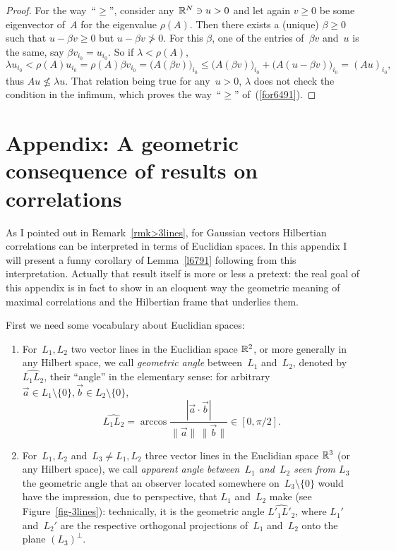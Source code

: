 \begin{proof}
For the way~``$\geq$'', consider any~$\mathbb{R}^N \ni u > 0$
and let again $v \geq 0$ be some eigenvector of~$A$
for the eigenvalue $\rho(A)$.
Then there exists a (unique) $\beta \geq 0$
such that $u-\beta v \geq 0$ but $u - \beta v \ngtr 0$.
For this $\beta$, one of the entries of~$\beta v$ and~$u$
is the same, say $\beta v_{i_0} = u_{i_0}$.
So if $\lambda < \rho(A)$,
\[ \lambda u_{i_0} < \rho(A) u_{i_0} = \rho(A) \beta v_{i_0} = \big(A(\beta v)\big)_{i_0}
\leq \big(A(\beta v)\big)_{i_0} + \big(A(u-\beta v)\big)_{i_0}
= (Au)_{i_0} ,\]
thus $Au \nleqslant \lambda u$.
That relation being true for any~$u>0$, $\lambda$ does not check the condition in the infimum,
which proves the way~``$\geq$'' of~(\ref{for6491}).
\end{proof}




\section{Appendix: A geometric consequence of results on correlations}\label{par3lines}

As I pointed out in Remark~\ref{rmk>3lines}, for Gaussian vectors
Hilbertian correlations can be interpreted in terms of Euclidian spaces.
In this appendix I will present a funny corollary of Lemma~\ref{l6791}
following from this interpretation.
Actually that result itself is more or less a pretext:
the real goal of this appendix is in fact to show in an eloquent way
the geometric meaning of maximal correlations
and the Hilbertian frame that underlies them.

First we need some vocabulary about Euclidian spaces:
%
\begin{Def}\strut
\begin{enumerate}
\item For~$L_1,L_2$ two vector lines in the Euclidian space $\mathbb{R}^2$,
or more generally in any Hilbert space,
we call \emph{geometric angle} between~$L_1$ and~$L_2$,
denoted by~$\widehat{L_1L_2}$, their ``angle'' in the elementary sense:
for arbitrary $\vec{a}\in L_1\setminus\{0\}, \vec{b}\in L_2\setminus\{0\}$,
\[\widehat{L_1L_2}= \arccos \frac{|\vec{a}\cdot\vec{b}|}{\|\vec{a}\|\,\|\vec{b}\|} \in [0,\pi/2].\]
%
\item For~$L_1,L_2$ and~$L_3\neq L_1,L_2$ three vector lines in the Euclidian space $\mathbb{R}^3$
(or any Hilbert space),
we call \emph{apparent angle between~$L_1$ and~$L_2$ seen from $L_3$}
the geometric angle that an observer located somewhere on~$L_3\setminus\{0\}$
would have the impression, due to perspective, that $L_1$ and~$L_2$ make
(see Figure~\ref{fig-3lines}): technically,
it is the geometric angle $\widehat{L'_1L'_2}$,
where $L_1'$ and~$L_2'$ are the respective orthogonal projections of~$L_1$ and~$L_2$
onto the plane $(L_3)^\perp$.
\end{enumerate}
\end{Def}

